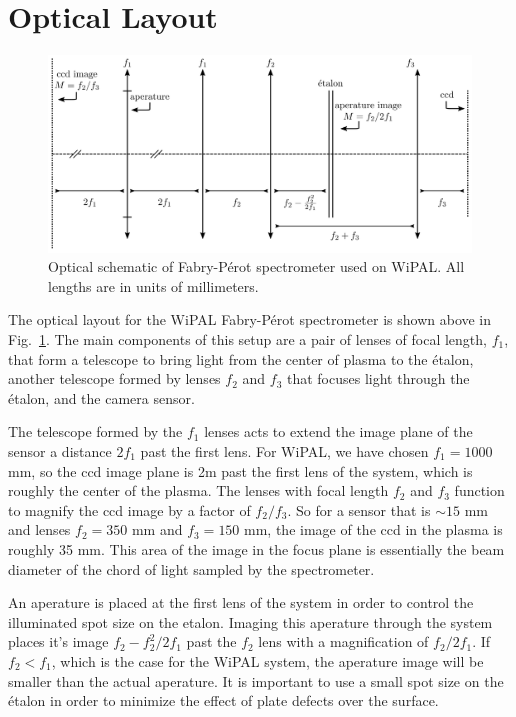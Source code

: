 \documentclass{article}
\begin{document}
\section{Optical Layout}
\begin{figure}
\includegraphics[width=\textwidth]{Images/OpticalLayout.png}
\caption{Optical schematic of Fabry-P\'{e}rot spectrometer used on WiPAL. All lengths are in units of millimeters. \label{fig:opticalsetup}}
\end{figure}
The optical layout for the WiPAL Fabry-P\'{e}rot spectrometer is shown above in Fig.~\ref{fig:opticalsetup}. The main components of this setup are a pair of lenses of focal length, $f_{1}$, that form a telescope to bring light from the center of plasma to the \'{e}talon, another telescope formed by lenses $f_{2}$ and $f_{3}$ that focuses light through the \'{e}talon, and the camera sensor.

The telescope formed by the $f_{1}$ lenses acts to extend the image plane of the sensor a distance $2f_{1}$ past the first lens. For WiPAL, we have chosen $f_{1}=1000$ mm, so the ccd image plane is 2m past the first lens of the system, which is roughly the center of the plasma. The lenses with focal length $f_{2}$ and $f_{3}$ function to magnify the ccd image by a factor of $f_{2}/f_{3}$. So for a sensor that is $\sim15$ mm and lenses $f_{2}=350$ mm and $f_{3}=150$ mm, the image of the ccd in the plasma is roughly 35 mm. This area of the image in the focus plane is essentially the beam diameter of the chord of light sampled by the spectrometer.

An aperature is placed at the first lens of the system in order to control the illuminated spot size on the etalon. Imaging this aperature through the system places it's image $f_{2}-f_{2}^{2}/2f_{1}$  past the $f_{2}$ lens with a magnification of $f_{2}/2f_{1}$. If $f_{2}<f_{1}$, which is the case for the WiPAL system, the aperature image will be smaller than the actual aperature. It is important to use a small spot size on the \'{e}talon in order to minimize the effect of plate defects over the surface.
\end{document}

